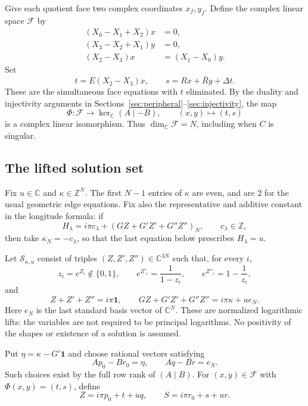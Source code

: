 \documentclass[11pt]{article}
\theoremstyle{definition}\newtheorem{definition}[theorem]{Definition}
\theoremstyle{remark}\newtheorem{remark}[theorem]{Remark}
\newcommand{\Z}{\mathbb Z}
\newcommand{\Rt}{\overline R}
\begin{document}
Give each quotient face two complex coordinates $x_f,y_f$. Define the complex linear space $\mathcal F$ by
\begin{equation}
\begin{aligned}
(X_0-X_1+X_2)x&=0,\\
(X_3-X_2+X_1)y&=0,\\
(X_2-X_3)x&=(X_1-X_0)y.
\end{aligned}\label{eq:affineface}
\end{equation}
Set
\[
t=E(X_2-X_3)x,\qquad s=Rx+\Rt y+\Delta t.
\]
These are the simultaneous face equations with $t$ eliminated. By the duality and injectivity arguments in Sections~\ref{sec:peripheral}--\ref{sec:injectivity}, the map
\[
\Phi:\mathcal F\longrightarrow\ker_{\mathbb C}(A\mid-B),\qquad (x,y)\longmapsto(t,s)
\]
is a complex linear isomorphism. Thus $\dim_{\mathbb C}\mathcal F=N$, including when $C$ is singular.

\subsection{The lifted solution set}
Fix $u\in\mathbb C$ and $\kappa\in\Z^N$. The first $N-1$ entries of $\kappa$ are even, and are $2$ for the usual geometric edge equations. Fix also the representative and additive constant in the longitude formula: if
\[
H_\lambda=i\pi c_\lambda+(GZ+G'Z'+G''Z'')_N,
\qquad c_\lambda\in\Z,
\]
then take $\kappa_N=-c_\lambda$, so that the last equation below prescribes $H_\lambda=u$.

Let $\mathcal S_{\kappa,u}$ consist of triples $(Z,Z',Z'')\in\mathbb C^{3N}$ such that, for every $i$,
\[
z_i=e^{Z_i}\notin\{0,1\},\qquad
e^{Z'_i}=\frac{1}{1-z_i},\qquad
e^{Z''_i}=1-\frac{1}{z_i},
\]
and
\[
Z+Z'+Z''=i\pi\mathbf1,\qquad
GZ+G'Z'+G''Z''=i\pi\kappa+u e_N.
\]
Here $e_N$ is the last standard basis vector of $\mathbb C^N$. These are normalized logarithmic lifts: the variables are not required to be principal logarithms. No positivity of the shapes or existence of a solution is assumed.

Put $\eta=\kappa-G'\mathbf1$ and choose rational vectors satisfying
\[
Ap_0-Br_0=\eta,\qquad Aq-Br=e_N.
\]
Such choices exist by the full row rank of $(A\mid B)$. For $(x,y)\in\mathcal F$ with $\Phi(x,y)=(t,s)$, define
\begin{equation}
Z=i\pi p_0+t+u q,\qquad S=i\pi r_0+s+u r.
\label{eq:affineZS}
\end{equation}
\end{document}
